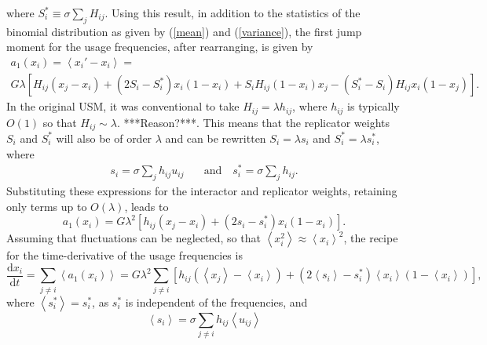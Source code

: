 \documentclass[12pt]{article}
\begin{document}
where $S_i^* \equiv \sigma \sum\limits_{j} H_{ij}$. Using this result, in addition to the statistics of the binomial distribution as given by (\ref{mean}) and (\ref{variance}), the first jump moment for the usage frequencies, after rearranging, is given by
\begin{multline}
a_1(x_i) = \left\langle x_i' - x_i \right\rangle = \\ G \lambda \left[ H_{ij}(x_j - x_i) + (2S_i - S_i^*)x_i(1-x_i) + S_i H_{ij}(1-x_i)x_j - (S_i^* - S_i)H_{ij}x_i(1-x_j)\right].
\end{multline}
In the original USM, it was conventional to take $H_{ij} = \lambda h_{ij}$, where $h_{ij}$ is typically $O(1)$ so that $H_{ij} \sim \lambda $. ***Reason?***.  This means that the replicator weights $S_i$ and $S_i^*$ will also be of order $\lambda$ and can be rewritten $S_i = \lambda s_i$ and $S_i^* = \lambda s_i^*$, where 
\begin{align}\label{sisistar}
s_{i} = \sigma \sum\limits_{j} h_{ij}u_{ij} & \quad \text{and} \quad s_{i}^* = \sigma \sum\limits_{j} h_{ij}.
\end{align}
Substituting these expressions for the interactor and replicator weights, retaining only terms up to $O(\lambda)$, leads to 
\begin{equation}
a_1(x_i) = G \lambda^2 \left[ h_{ij} (x_j - x_i) + (2s_i - s_i^*)x_i(1-x_i) \right].
\end{equation}
Assuming that fluctuations can be neglected, so that $\left\langle x_i ^2 \right\rangle \approx \left\langle x_i  \right\rangle^2$, the recipe for the time-derivative of the usage frequencies is
\begin{equation}\label{mf1}
\frac{\mathrm d x_i}{\mathrm d t} = \sum\limits_{j \neq i} \left\langle a_1(x_i) \right\rangle = G \lambda^2 \sum\limits_{j \neq i} \left[ h_{ij} (\left\langle x_j \right\rangle -\left\langle x_i\right\rangle) + (2\left\langle s_i \right\rangle- s_i^*)\left\langle x_i\right\rangle(1-\left\langle x_i\right\rangle) \right],
\end{equation}
where $\left\langle s_i^*\right\rangle = s_i^*$, as $s_i^*$ is independent of the frequencies, and 
\begin{equation}
\left\langle s_i \right\rangle = \sigma \sum\limits_{j \neq i} h_{ij} \left\langle u_{ij} \right\rangle
\end{equation}
\end{document}
